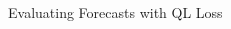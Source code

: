 \documentclass{beamer} %
\begin{document}
\begin{frame}[t]
\begin{columns}[t]
\begin{column}{0.465\textwidth}
\begin{block}{Evaluating Forecasts with QL Loss}
\begin{itemize}
	\end{itemize}
\end{block}

\end{column} %



\begin{column}{0.03\textwidth}\end{column} %
 
\begin{column}{0.465\textwidth} %


	
  
	  
  

\end{column}
\end{columns}
\end{frame}
\end{document}
